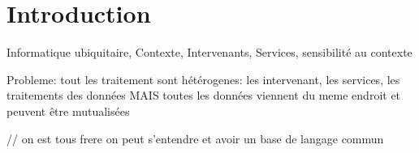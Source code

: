 \chapter{Introduction}
Informatique ubiquitaire, Contexte, Intervenants, Services, sensibilité au contexte

Probleme: tout les traitement sont hétérogenes: les intervenant, les services, les traitements des données
MAIS toutes les données viennent du meme endroit et peuvent être mutualisées

 // on est tous frere on peut s'entendre et avoir un base de langage commun 